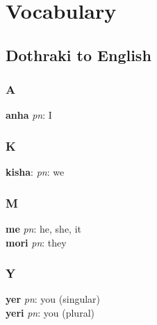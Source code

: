 \chapter{Vocabulary}
\section*{Dothraki to English}
\begin{multicols}{2}
\subsection*{A}
\textbf{anha} \textit{pn}: I \\
\subsection*{K}
\textbf{kisha}: \textit{pn}: we \\
\subsection*{M}
\textbf{me} \textit{pn}: he, she, it \\
\textbf{mori} \textit{pn}: they \\
\subsection*{Y}
\textbf{yer} \textit{pn}: you (singular) \\
\textbf{yeri} \textit{pn}: you (plural) \\
\end{multicols}
\pagebreak
